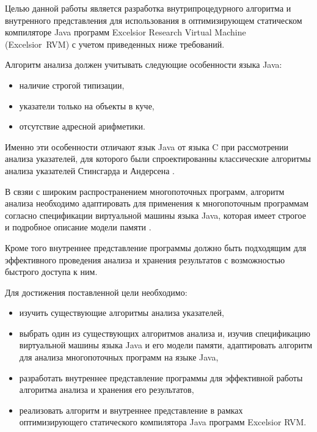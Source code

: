 \documentclass[14pt,titlepage]{extarticle}
\newcommand{\eng}[1]{{\English#1}}
\begin{document}
    Целью данной работы является разработка внутрипроцедурного алгоритма и
    внутренного представления для использования в оптимизирующем
    статическом компиляторе Java программ
    \eng{Excelsior Research Virtual Machine (Excelsior~RVM)}
    \cite{excelsior_jet} с учетом приведенных ниже требований.

    Алгоритм анализа должен учитывать следующие особенности языка Java:
    \begin{itemize}
      \item наличие строгой типизации,
      \item указатели только на объекты в куче,
      \item отсутствие адресной арифметики.
    \end{itemize}
    Именно эти особенности отличают язык Java от языка C при рассмотрении
    анализа указателей, для которого были
    спроектированны классические алгоритмы анализа указателей
    Стинсгарда \cite{steensgaard} и Андерсена \cite{andersen}.

    В свзяи с широким распространением многопоточных программ,
    алгоритм анализа необходимо адаптировать для применения к
    многопоточным программам согласно спецификации виртуальной машины языка
    Java, которая имеет строгое и подробное описание модели памяти
    \cite{manson_jmm}.

    Кроме того внутреннее представление программы должно быть подходящим для
    эффективного проведения анализа и хранения результатов с возможностью
    быстрого доступа к ним.

    Для достижения поставленной цели необходимо:
    \begin{itemize}
      \item изучить существующие алгоритмы анализа указателей,
      \item выбрать один из существующих алгоритмов анализа и, изучив
            спецификацию виртуальной машины языка Java и его модели памяти,
            адаптировать алгоритм для анализа многопоточных программ на языке
            Java,
      \item разработать внутреннее представление программы для эффективной
            работы алгоритма анализа и хранения его результатов,
      \item реализовать алгоритм и внутреннее представление в рамках
            оптимизирующего статического компилятора Java программ
            \eng{Excelsior RVM}.
    \end{itemize}
\end{document}

